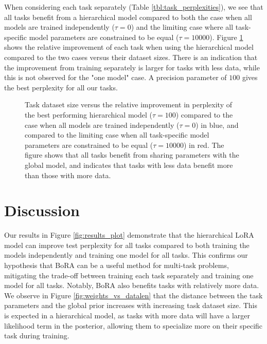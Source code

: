 \documentclass[fullpaper,final]{nldl}
\begin{document}
When considering each task separately (Table \ref{tbl:task_perplexities}), we see that all tasks benefit from a hierarchical model compared to both the case when all models are trained independently ($\tau = 0$) and the limiting case where all task-specific model parameters are constrained to be equal ($\tau=10000$). Figure \ref{fig:relative_improvement} shows the relative improvement of each task when using the hierarchical model compared to the two cases versus their dataset sizes. There is an indication that the improvement from training separately is larger for tasks with less data, while this is not observed for the "one model" case. A precision parameter of $100$ gives the best perplexity for all our tasks.
\begin{figure}[ht]
    \centering
    \caption{Task dataset size versus the relative improvement in perplexity of the best performing hierarchical model ($\tau = 100$) compared to the case when all models are trained independently ($\tau = 0$) in blue, and compared to the limiting case when all task-specific model parameters are constrained to be equal ($\tau=10000$) in red. The figure shows that all tasks benefit from sharing parameters with the global model, and indicates that tasks with less data benefit more than those with more data.}
    \label{fig:relative_improvement}
\end{figure}

\section{Discussion} \label{sec:discussion}
Our results in Figure \ref{fig:results_plot} demonstrate that the hierarchical LoRA model can improve test perplexity for all tasks compared to both training the models independently and training one model for all tasks. This confirms our hypothesis that BoRA can be a useful method for multi-task problems, mitigating the trade-off between training each task separately and training one model for all tasks. Notably, BoRA also benefits tasks with relatively more data.
We observe in Figure \ref{fig:weights_vs_datalen} that the distance between the task parameters and the global prior increases with increasing task dataset size. This is expected in a hierarchical model, as tasks with more data will have a larger likelihood term in the posterior, allowing them to specialize more on their specific task during training.
\end{document}
